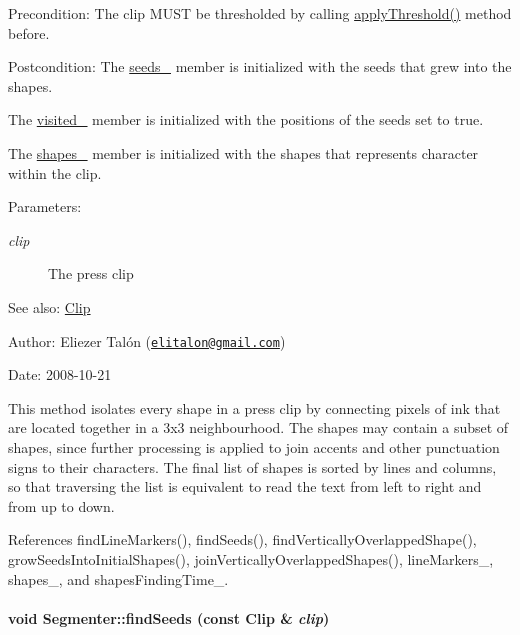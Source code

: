 \begin{Desc}
\item[Precondition:]The clip MUST be thresholded by calling \hyperlink{class_segmenter_6854315e3320f9d9a8ece14cbb8570ee}{applyThreshold()} method before.\end{Desc}
\begin{Desc}
\item[Postcondition:]The \hyperlink{class_segmenter_7859d050250b9fdf7c96374f80008d6e}{seeds\_\-} member is initialized with the seeds that grew into the shapes. 

The \hyperlink{class_segmenter_fe4dd18749f268aae2b26a1abff6a607}{visited\_\-} member is initialized with the positions of the seeds set to true. 

The \hyperlink{class_segmenter_41b94ede2829063e0937dc150756e77e}{shapes\_\-} member is initialized with the shapes that represents character within the clip.\end{Desc}
\begin{Desc}
\item[Parameters:]
\begin{description}
\item[{\em clip}]The press clip\end{description}
\end{Desc}
\begin{Desc}
\item[See also:]\hyperlink{class_clip}{Clip}\end{Desc}
\begin{Desc}
\item[Author:]Eliezer Talón (\href{mailto:elitalon@gmail.com}{\tt elitalon@gmail.com}) \end{Desc}
\begin{Desc}
\item[Date:]2008-10-21\end{Desc}
This method isolates every shape in a press clip by connecting pixels of ink that are located together in a 3x3 neighbourhood. The shapes may contain a subset of shapes, since further processing is applied to join accents and other punctuation signs to their characters. The final list of shapes is sorted by lines and columns, so that traversing the list is equivalent to read the text from left to right and from up to down. 

References findLineMarkers(), findSeeds(), findVerticallyOverlappedShape(), growSeedsIntoInitialShapes(), joinVerticallyOverlappedShapes(), lineMarkers\_\-, shapes\_\-, and shapesFindingTime\_\-.\hypertarget{class_segmenter_bacab187b543a51c5322c01fc0a29ffb}{
\paragraph[findSeeds]{\setlength{\rightskip}{0pt plus 5cm}void Segmenter::findSeeds (const {\bf Clip} \& {\em clip})}\hfill}
\label{class_segmenter_bacab187b543a51c5322c01fc0a29ffb}


